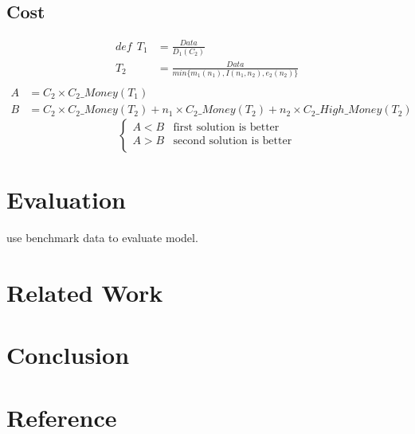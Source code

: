 \documentclass{article}
\begin{document}
	\subsection{Cost}
		\begin{align*}
			def\ \ T_1&=\frac{Data}{D_1(C_2)}\\ T_2&=\frac{Data}{min\{m_1(n_1),I(n_1,n_2),e_2(n_2)\}}\\
		\end{align*}
		\begin{align*}
			A&=C_2\times C_2\_Money(T_1)\\
			B&=C_2\times C_2\_Money(T_2)+n_1\times C_2\_Money(T_2)+n_2\times C_2\_High\_Money(T_2)
		\end{align*}
		\begin{equation*}
			\begin{cases}
				A<B & \text{first solution is better}\\
				A>B & \text{second solution is better}\\
			\end{cases}
		\end{equation*}


\section{Evaluation}
use benchmark data to evaluate model.

\section{Related Work}


\section{Conclusion}


\section*{Reference}
\end{document}
